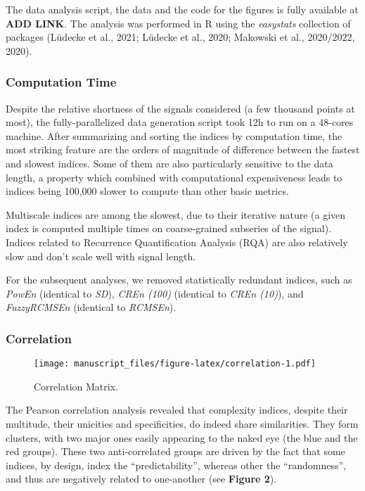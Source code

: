 \documentclass[
  man]{apa6}
\begin{document}
The data analysis script, the data and the code for the figures is fully available at \textbf{ADD LINK}. The analysis was performed in R using the \emph{easystats} collection of packages (Lüdecke et al., 2021; Lüdecke et al., 2020; Makowski et al., 2020/2022, 2020).

\hypertarget{computation-time}{%
\subsubsection{Computation Time}\label{computation-time}}

Despite the relative shortness of the signals considered (a few thousand points at most), the fully-parallelized data generation script took 12h to run on a 48-cores machine. After summarizing and sorting the indices by computation time, the most striking feature are the orders of magnitude of difference between the fastest and slowest indices. Some of them are also particularly sensitive to the data length, a property which combined with computational expensiveness leads to indices being 100,000 slower to compute than other basic metrics.

Multiscale indices are among the slowest, due to their iterative nature (a given index is computed multiple times on coarse-grained subseries of the signal). Indices related to Recurrence Quantification Analysis (RQA) are also relatively slow and don't scale well with signal length.

For the subsequent analyses, we removed statistically redundant indices, such as \emph{PowEn} (identical to \emph{SD}), \emph{CREn (100)} (identical to \emph{CREn (10)}), and \emph{FuzzyRCMSEn} (identical to \emph{RCMSEn}).

\hypertarget{correlation}{%
\subsubsection{Correlation}\label{correlation}}

\begin{figure}
\centering
\texttt{[image: manuscript\_files/figure-latex/correlation-1.pdf]}
\caption{\label{fig:correlation}Correlation Matrix.}
\end{figure}

The Pearson correlation analysis revealed that complexity indices, despite their multitude, their unicities and specificities, do indeed share similarities. They form clusters, with two major ones easily appearing to the naked eye (the blue and the red groups). These two anti-correlated groups are driven by the fact that some indices, by design, index the ``predictability'', whereas other the ``randomness'', and thus are negatively related to one-another (see \textbf{Figure 2}).
\end{document}

